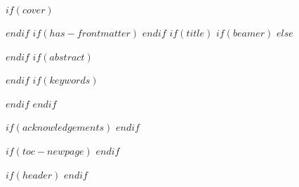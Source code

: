 $if(cover)$

$endif$
$if(has-frontmatter)$
\frontmatter
$endif$
$if(title)$
$if(beamer)$
\frame{\titlepage}
$else$
\maketitle
$endif$
$if(abstract)$
\begin{abstract}
$abstract$
\end{abstract}
$endif$
$if(keywords)$
\begin{center}
\end{center}
$endif$
$endif$

$if(acknowledgements)$
$endif$

$if(toc-newpage)$
\newpage
$endif$

$if(header)$
$endif$